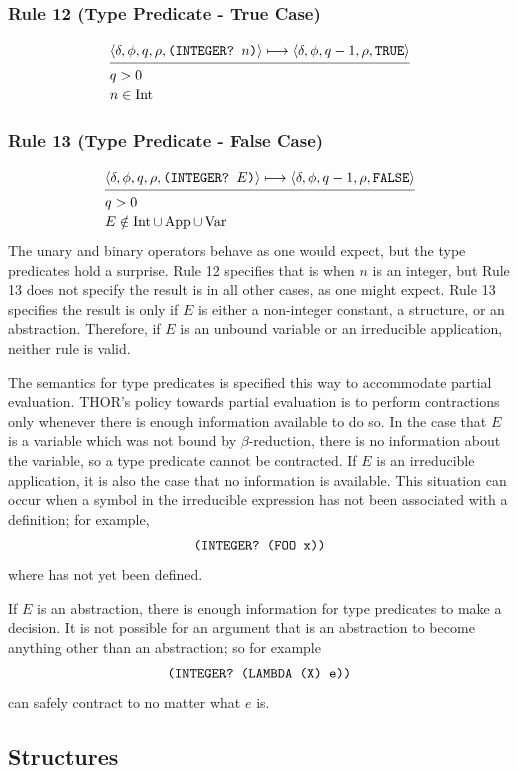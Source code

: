 \subsubsection*{Rule 12 (Type Predicate - True Case)}
\[
\semanticrule{
\cfg{\delta}{\phi}{q}{\rho}{\THOR{(INTEGER? }n\THOR{)}}\redsto
      \cfg{\delta}{\phi}{q-1}{\rho}{\THOR{TRUE}}
}{
q>0\\ n\in\Int
}
\]

\subsubsection*{Rule 13 (Type Predicate - False Case)}
\[
\semanticrule{
\cfg{\delta}{\phi}{q}{\rho}{\THOR{(INTEGER? }E\THOR{)}}\redsto
      \cfg{\delta}{\phi}{q-1}{\rho}{\THOR{FALSE}}
}{
q>0\\ E\notin \Int\cup\App\cup\Var
}
\]
The unary and binary operators behave as one would expect, but the type
predicates hold a surprise. Rule 12 specifies that  is
 when \(n\) is an integer, but Rule 13 does not specify the result is
 in all other cases, as one might expect. Rule 13 specifies the
result is  only if \(E\) is either a non-integer constant, a
structure, or an abstraction. Therefore, if \(E\) is an unbound variable or an
irreducible application, neither rule is valid.

The semantics for type predicates is specified this way to accommodate partial
evaluation. THOR's policy towards partial evaluation is to perform contractions
only whenever there is enough information available to do so. In the case that
\(E\) is a variable which was not bound by \(\beta\)-reduction, there is no
information about the variable, so a type predicate cannot be contracted. If
\(E\) is an irreducible application, it is also the case that no information is
available. This situation can occur when a symbol in the irreducible expression
has not been associated with a definition; for example,
\[
\texttt{(INTEGER? (FOO x))}
\]
where  has not yet been defined.

If \(E\) is an abstraction, there is enough information for type predicates to
make a decision. It is not possible for an argument that is an abstraction to
become anything other than an abstraction; so for example
\[
\texttt{(INTEGER? (LAMBDA (X) e))}
\]
can safely contract to  no matter what \(e\) is.

\subsection{Structures}

